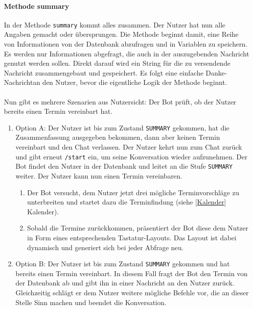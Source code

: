             \paragraph{Methode summary}
                In der Methode \verb|summary| kommt alles zusammen. Der Nutzer hat nun alle Angaben gemacht oder übersprungen. Die Methode beginnt damit, eine Reihe von Informationen von der Datenbank abzufragen und in Variablen zu speichern. Es werden nur Informationen abgefragt, die auch in der auszugebenden Nachricht genutzt werden sollen. Direkt darauf wird ein String für die zu versendende Nachricht zusammengebaut und gespeichert. Es folgt eine einfache \glqq Danke-Nachricht\grqq an den Nutzer, bevor die eigentliche Logik der Methode beginnt.\\
                \\
                Nun gibt es mehrere Szenarien aus Nutzersicht: Der Bot prüft, ob der Nutzer bereits einen Termin vereinbart hat.
                
                \begin{enumerate}
                
                    \item Option A:  Der Nutzer ist bis zum Zustand \verb|SUMMARY| gekommen, hat die Zusammenfassung ausgegeben bekommen, dann aber keinen Termin vereinbart und den Chat verlassen. Der Nutzer kehrt nun zum Chat zurück und gibt erneut \verb|/start| ein, um seine Konversation wieder aufzunehmen. Der Bot findet den Nutzer in der Datenbank und leitet an die Stufe \verb|SUMMARY| weiter. Der Nutzer kann nun einen Termin vereinbaren. \\
                    
                    \begin{enumerate}
                        \item Der Bot versucht, dem Nutzer jetzt drei mögliche Terminvorschläge zu unterbreiten und startet dazu die Terminfindung (siehe \ref{Kalender} Kalender).
                        \item Sobald die Termine zurückkommen, präsentiert der Bot diese dem Nutzer in Form eines entsprechenden Tastatur-Layouts. Das Layout ist dabei dynamisch und generiert sich bei jeder Abfrage neu.
                    \end{enumerate}
                
                    \item Option B: Der Nutzer ist bis zum Zustand \verb|SUMMARY| gekommen und hat bereits einen Termin vereinbart. In diesem Fall fragt der Bot den Termin von der Datenbank ab und gibt ihn in einer Nachricht an den Nutzer zurück. Gleichzeitig schlägt er dem Nutzer weitere mögliche Befehle vor, die an dieser Stelle Sinn machen und beendet die Konversation.
                
                \end{enumerate}

